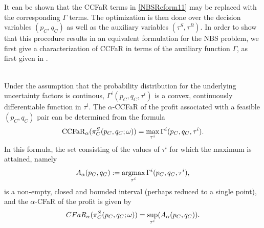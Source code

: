 It can be shown that the CCFaR terms in \eqref{NBSReform11} may be replaced with
the corresponding $\Gamma$ terms. The optimization is then done over the
decision variables $(p_C, q_C)$ as well as the auxiliary variables $(\tau^S,
\tau^B)$. In order to show that this procedure results in an equivalent
formulation for the NBS problem, we first give a characterization of CCFaR in terms of the
auxiliary function $\Gamma$, as first given in \cite{rockafellar_optimization_2000}.

\begin{lemma}\label{lemma11}\citep{rockafellar_optimization_2000} \\
	Under the assumption that the probability distribution for the underlying uncertainty factors is continous, $\Gamma^i(p_C, q_C, \tau^i)$ is a convex, continuously differentiable function in $\tau^i$. The $\alpha$-CCFaR of the profit associated with a feasible $(p_C, q_C)$ pair can be determined from the formula
	\begin{equation*}
		\text{CCFaR}_{\alpha}(\pi_C^S(p_C, q_C; \omega)) = \displaystyle\mathop{\hbox{\rm max}}_{\tau^i} \Gamma^i (p_C, q_C, \tau^i).
	\end{equation*}
	In this formula, the set consisting of the values of $\tau^i$ for which the maximum is attained, namely
	\begin{equation*}
		A_{\alpha}(p_C, q_C) := \displaystyle \mathop{\mbox{argmax}}_{\tau^i} \Gamma^i(p_C, q_C, \tau^i),
	\end{equation*}
	is a non-empty, closed and bounded interval (perhaps reduced to a single point), and the $\alpha$-CFaR of the profit is given by
	\begin{equation*}
		CFaR_{\alpha}(\pi^S_C(p_C, q_C; \omega)) = \displaystyle \mathop{\hbox{\rm sup}}_{\tau^i} (A_{\alpha}(p_C, q_C)).
	\end{equation*}
\end{lemma} 

